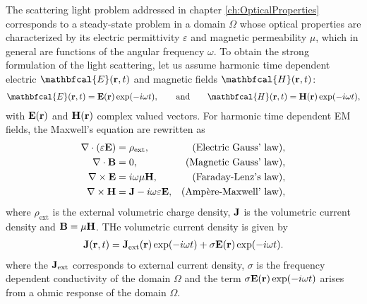 
The scattering light problem addressed in chapter \ref{ch:OpticalProperties} corresponds to a steady-state problem in a domain $\Omega$ whose optical properties are characterized by its electric permittivity $\varepsilon$ and magnetic permeability $\mu$, which in general are functions of the angular frequency $\omega$. To obtain the strong formulation of the light scattering, let us assume harmonic time dependent electric $\mathbfcal{E}(\vb{r},t)$ and magnetic fields $\mathbfcal{H}(\vb{r},t)$:
%
\begin{align}
    \mathbfcal{E}(\vb{r},t) = \vb{E}(\vb{r})\exp(-i\omega t),
        \qquad
        \text{and}
        \qquad
    \mathbfcal{H}(\vb{r},t) =  \vb{H}(\vb{r}) \exp(-i\omega t),
\end{align}
%
with $ \vb{E}(\vb{r})$ and $ \vb{H}(\vb{r})$ complex valued vectors. For harmonic time dependent EM fields, the Maxwell's equation are rewritten as \cite{jin_theory_2010,larson_finite_2013}
%
\begin{subequations}
    \label{eq:MaxwellsEq}
\begin{align}
    \nabla \cdot \qty(\varepsilon \vb{E})  &= \rho_\text{ext},  &\mbox{(Electric Gauss' law)},\\
    \nabla \cdot   \vb{B} &= 0, & \mbox{(Magnetic Gauss' law)},
            \label{eq:GaussM}\\
    \nabla \times \vb{E}  &= i\omega \mu \vb{H},  &  \mbox{(Faraday-Lenz's law)},\\
    \nabla \times \vb{H}  &= \vb{J} - i\omega \varepsilon \vb{E}, & \mbox{(Ampère-Maxwell' law)},
\end{align}
\end{subequations}
%
where  $\rho_\text{ext}$ is the external volumetric charge density, $\vb{J}$ is the volumetric current density and  $\vb{B} = \mu \vb{H}$. THe volumetric current density is given by \cite{larson_finite_2013}
%
\begin{align}
    \vb{J}(\vb{r},t) = \vb{J}_\text{ext}(\vb{r})\exp(-i\omega t) + \sigma \vb{E}(\vb{r})\exp(-i\omega t).
    \label{eq:ohmic}
\end{align}
%
where the $\vb{J}_\text{ext}$ corresponds to external current density, $\sigma$ is the frequency dependent conductivity of the domain $\Omega$ and the term $\sigma \vb{E}(\vb{r})\exp(-i\omega t)$ arises from a ohmic response of the domain $\Omega$.

